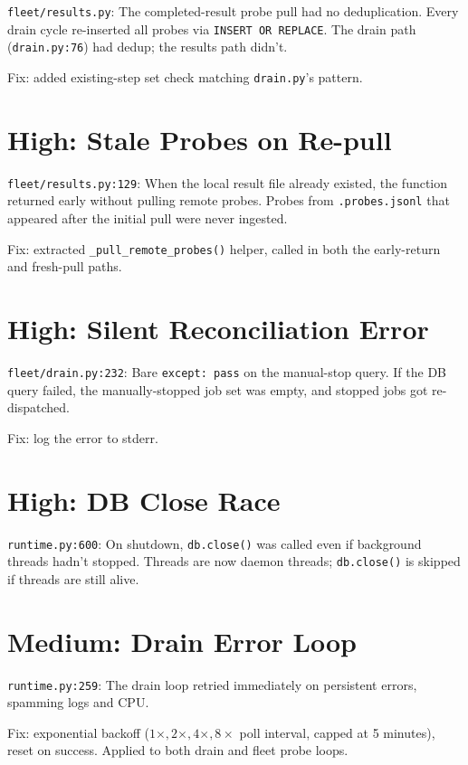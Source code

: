 \documentclass[11pt,a4paper]{report}
\begin{document}
\texttt{fleet/results.py}: The completed-result probe pull had no deduplication. Every drain cycle re-inserted all probes via \texttt{INSERT OR REPLACE}. The drain path (\texttt{drain.py:76}) had dedup; the results path didn't.

Fix: added existing-step set check matching \texttt{drain.py}'s pattern.

\section{High: Stale Probes on Re-pull}

\texttt{fleet/results.py:129}: When the local result file already existed, the function returned early without pulling remote probes. Probes from \texttt{.probes.jsonl} that appeared after the initial pull were never ingested.

Fix: extracted \texttt{\_pull\_remote\_probes()} helper, called in both the early-return and fresh-pull paths.

\section{High: Silent Reconciliation Error}

\texttt{fleet/drain.py:232}: Bare \texttt{except: pass} on the manual-stop query. If the DB query failed, the manually-stopped job set was empty, and stopped jobs got re-dispatched.

Fix: log the error to stderr.

\section{High: DB Close Race}

\texttt{runtime.py:600}: On shutdown, \texttt{db.close()} was called even if background threads hadn't stopped. Threads are now daemon threads; \texttt{db.close()} is skipped if threads are still alive.

\section{Medium: Drain Error Loop}

\texttt{runtime.py:259}: The drain loop retried immediately on persistent errors, spamming logs and CPU.

Fix: exponential backoff ($1\times, 2\times, 4\times, 8\times$ poll interval, capped at 5 minutes), reset on success. Applied to both drain and fleet probe loops.
\end{document}
